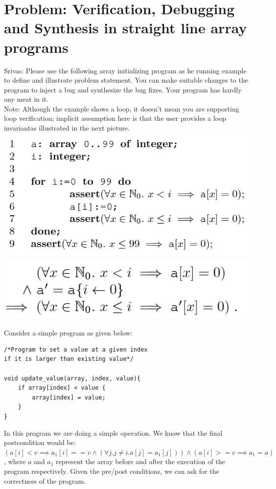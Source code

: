 \documentclass[a4paper, 12pt, notitlepage] {article}
\newcommand{\mscmt}[1]{{\color{blue} \tiny{Srivas: {#1}}}}
\begin{document}
\section {Problem: Verification, Debugging and Synthesis in straight line array programs}
\mscmt{Please use the following array initializing program as he running example to define and illustrate problem statement.
You can make suitable changes to the program to inject a bug and synthesize the bug fixes.
Your program has hardly any meat in it.\\
Note: Although the example shows a loop, it doesn't mean you are supporting loop verification; implicit assumption here is that the user provides a loop invariantas illustrated in the next picture.
\includegraphics[scale=0.6]{arrayprogex} \\
\includegraphics[scale=0.6]{arrayvc} 
}

Consider a simple program as given below:

\begin{verbatim}
/*Program to set a value at a given index 
if it is larger than existing value*/

void update_value(array, index, value){
    if array[index] < value {
        array[index] = value;
    }
}
\end{verbatim}

In this program we are doing a simple operation. We know that the final postcondition would be:  $( a[i] < v \implies a_1[i] == v \land (\forall{j} . j\neq i . a[j] = a_1[j]))    \land (a[i] >= v \implies a_1 = a)$, where $a$ and $a_1$ represent the array before and after the execution of the program respectively.
Given the pre/post conditions, we can ask for the correctness of the program.\\
\end{document}
